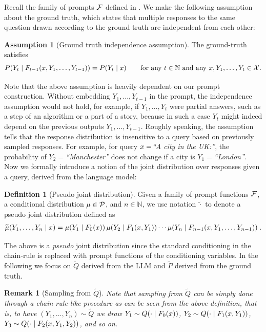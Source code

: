 \documentclass[a4paper]{article}
\theoremstyle{plain}
\theoremstyle{definition}
\newtheorem{definition}[theorem]{Definition}
\newtheorem{assumption}[theorem]{Assumption}
\theoremstyle{plain}
\newtheorem{remark}[theorem]{Remark}
\begin{document}
Recall the family of prompts $\mathcal{F}$ defined in . We make the following assumption about the ground truth, which states that multiple responses to the same question drawn according to the ground truth are independent from each other:
%
\begin{assumption}[Ground truth independence assumption]
  \label{asm:indep}
The ground-truth satisfies
\begin{align*}
P(Y_t \mid F_{t-1}(x,Y_1,\ldots,Y_{t-1})) = P(Y_t \mid x) \qquad \text{for any $t\in \mathbb{N}$ and any $x, Y_1,\ldots,Y_t \in {\mathcal{X}}$.}
\end{align*}
\end{assumption}
Note that the above assumption is heavily dependent on our prompt construction. Without embedding $Y_1,\ldots,Y_{t-1}$ in the prompt, the independence assumption would not hold, for example, 
if $Y_1,\ldots,Y_t$ were partial answers, such as a step of an algorithm or a part of a story, because in such a case $Y_t$ might indeed depend on the previous outputs $Y_1,\ldots,Y_{t-1}$.
Roughly speaking, the assumption tells that the response distribution is
insensitive to a query based on previously sampled responses.
For example, for query $x=$\emph{``A city in the UK:''}, the probability of $Y_2=$\emph{``Manchester''} does not change if a city is $Y_1=$\emph{``London''}. 
%
%
Now we formally introduce a notion of the joint distribution over responses given a query, derived from the language model:
%
\label{sec:pseudo}
\begin{definition}[Pseudo joint distribution]
  \label{def:pseudo-joint}
  Given a family of prompt functions $\mathcal{F}$, a conditional distribution $\mu \in {\mathcal{P}}$, and $n \in \mathbb{N}$, we use notation $\widetilde \cdot$ to denote a pseudo joint distribution defined as
  \begin{align}
    \widetilde \mu(Y_1,\dots,Y_n \mid x) = \mu(Y_1 \mid F_0(x)) \, \mu(Y_2\mid F_1(x,Y_1)) \cdots \mu(Y_n\mid F_{n-1}(x,Y_1,\ldots,Y_{n-1})) \;.
  \end{align}
\end{definition}
%
The above is a \emph{pseudo} joint distribution since the standard conditioning in the chain-rule is replaced with prompt functions of the conditioning variables.
In the following we focus on $\widetilde Q$ derived from the LLM and $\widetilde P$ derived from the ground truth.
%
%
\begin{remark}[Sampling from $\widetilde Q$]
  \label{rem:sampling}
  Note that sampling from $\widetilde Q$ can be simply done through a chain-rule-like procedure as can be seen from the above definition, that is, to have $(Y_1,\dots,Y_n) \sim \widetilde Q$ we draw $Y_1 \sim Q(\cdot \mid F_0(x))$, $Y_2 \sim Q(\cdot \mid F_1(x,Y_1))$, $Y_3 \sim Q(\cdot \mid F_2(x,Y_1,Y_2))$, and so on.
\end{remark}
%
\end{document}
